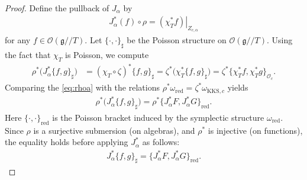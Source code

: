 \documentclass[11pt,reqno]{amsart}
\newtheorem*{theorem A}{Main Theorem A}
\newtheorem*{theorem B}{Main Theorem B}
\newtheorem*{theorem C}{Main Theorem C}
\newtheorem*{theorem D}{Main Theorem D}
\theoremstyle{definition}
\theoremstyle{plain}
\theoremstyle{conclusion}
\begin{document}
\begin{proof}
Define the pullback of $J_\alpha$ by \begin{align*}
    J_\alpha^*(f) \circ \rho = \left.(\chi_T^* f)\right\vert_{Z_{c,\alpha}}
\end{align*} for any $f \in \mathcal{O}\left(\mathfrak{g}//T\right)$. Let $\{\cdot,\cdot\}_{\sharp}$ be the Poisson structure on $\mathcal{O}\left(\mathfrak{g}//T\right)$. Using the fact that $\chi_T$ is Poisson, we compute \begin{align}
\rho^*\big(J_\alpha^*\{f,g\}_{\sharp}\big) &=(\chi_T\circ \zeta)^*\{f,g\}_{\sharp} =\zeta^*\big(\chi_T^*\{f,g\}_{\sharp}\big) =\zeta^*\big\{\chi_T^*f,\chi_T^*g\big\}_{\mathcal{O}_c}. \label{eq:rhoa}
\end{align} %
Comparing the \eqref{eq:rhoa}  with the relations $\rho^*\omega_{\mathrm{red}} = \zeta^* \omega_{\mathrm{KKS},c}$ yields
\begin{align*} 
\rho^*\big(J_\alpha^*\{f,g\}_{\sharp}\big)=\rho^*\big\{J_\alpha^*F,J_\alpha^*G\big\}_{\mathrm{red}}.
\end{align*} Here $\{\cdot,\cdot\}_{\mathrm{red}}$ is the Poisson bracket induced by the symplectic structure $\omega_{\mathrm{red}}$.
Since $\rho$ is a surjective submersion (on algebras), and $\rho^*$ is injective (on functions), the equality holds before applying $J_\alpha^*$ as follows:
\begin{align*}
J_\alpha^*\{f,g\}_{\sharp}=\{J_\alpha^*F,J_\alpha^*G\}_{\mathrm{red}}.
\end{align*} 
 


\end{proof}
\end{document}
